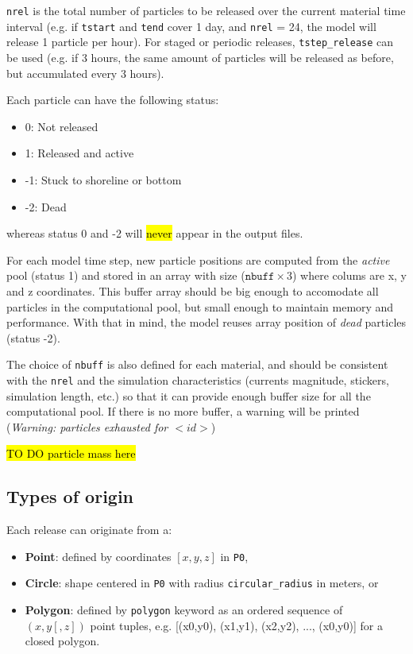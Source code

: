 \documentclass[a4paper]{article}
\begin{document}
\texttt{nrel} is the total number of particles to be released over the current material time interval (e.g. if \texttt{tstart} and \texttt{tend} cover 1 day, and \texttt{nrel} = 24, the model will release 1 particle per hour). For staged or periodic releases, \texttt{tstep\_release} can be used (e.g. if 3 hours, the same amount of particles will be released as before, but accumulated every 3 hours).

Each particle can have the following status:

\begin{itemize}
\item 0: Not released
\item 1: Released and active
\item -1: Stuck to shoreline or bottom
\item -2: Dead
\end{itemize}
 
whereas status 0 and -2 will \hl{never} appear in the output files.

For each model time step, new particle positions are computed from the \textit{active} pool (status 1) and stored in an array with size ($\texttt{nbuff}\times 3$)  where colums are x, y and z coordinates. This buffer array should be big enough to accomodate all particles in the computational pool, but small enough to maintain memory and performance. With that in mind, the model reuses array position of \textit{dead} particles (status -2). 


The choice of \texttt{nbuff} is also defined for each material, and should be consistent with the \texttt{nrel} and the simulation characteristics (currents magnitude, stickers, simulation length, etc.) so that it can provide enough buffer size for all the computational pool. If there is no more buffer, a warning will be printed (\textit{Warning: particles exhausted for  $<id>$})

\bigskip

\hl{TO DO particle mass here}

\bigskip

\subsection{Types of origin}
\label{ssec:origin}

Each release can originate from a:

\begin{itemize} 
\item \textbf{Point}: defined by coordinates $[x,y,z]$ in \texttt{P0}, 
\item \textbf{Circle}: shape centered in  \texttt{P0} with radius \texttt{circular\_radius} in meters, or
\item \textbf{Polygon}: defined by \texttt{polygon} keyword as an ordered sequence of $(x, y[, z])$ point tuples, e.g. [(x0,y0), (x1,y1), (x2,y2), ..., (x0,y0)] for a closed polygon.
\end{itemize}
\end{document}
